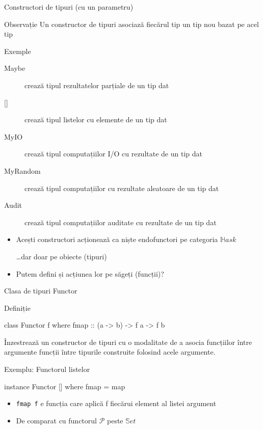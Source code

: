 \documentclass[xcolor=pdftex,romanian,colorlinks]{beamer}
\begin{document}
\begin{frame}[fragile]{Constructori de tipuri (cu un parametru)}

\begin{block}{Observație}
Un constructor de tipuri asociază fiecărul tip un tip nou bazat pe acel tip
\end{block}

\begin{block}{Exemple}
\begin{description}
\item[Maybe] crează tipul rezultatelor parțiale de un tip dat
\item[{[]}] crează tipul listelor cu elemente de un tip dat
\item[MyIO] crează tipul computațiilor I/O cu rezultate de un tip dat
\item[MyRandom] crează tipul computațiilor cu rezultate aleatoare de un tip dat
\item[Audit] crează tipul computațiilor auditate cu rezultate de un tip dat
\end{description}
\end{block}

\begin{itemize}
\item Acești constructori acționează ca niște endofunctori pe categoria $\mathbb{H}ask$

 \ldots dar doar pe obiecte (tipuri) 
 
\item Putem defini și acțiunea lor pe săgeți (funcții)?
\end{itemize}
\end{frame}


\begin{frame}[fragile]{Clasa de tipuri Functor}

\begin{block}{Definiție}
\vspace{-1ex}
\begin{asciihs}
class Functor f where
  fmap :: (a -> b) -> f a -> f b
\end{asciihs}
\vspace{-1ex}
Înzestrează un constructor de tipuri cu o modalitate de a asocia funcțiilor între argumente funcții între tipurile construite folosind acele argumente.
\end{block}

\begin{block}{Exemplu: Functorul listelor}
\vspace{-1ex}
\begin{asciihs}
instance Functor [] where
  fmap = map
\end{asciihs}
\vspace{-1ex}
\begin{itemize}
\item \lstinline$fmap f$ e funcția care aplică f fiecărui element al listei argument
\item De comparat cu functorul $\mathcal P$ peste $\mathbb{S}et$
\end{itemize}
\end{block}
\end{frame}
\end{document}
